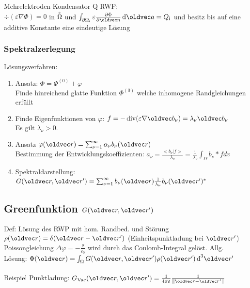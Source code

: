 \documentclass[6pt,a4paper]{scrartcl}
\let\vec\oldvec
\begin{document}
\begin{multicols}{4}
	Mehrelektroden-Kondensator Q-RWP:\\
	$\div(\varepsilon \nabla \Phi) = 0$ in $\overset{{}_\circ}{\Omega}$ und $\int_{\partial \Omega_l} \varepsilon \frac{\partial \Phi}{\partial \vec n} \diff \vec a = Q_l$ und  besitz bis auf eine additive Konstante eine eindeutige Lösung
	
	\subsubsection*{Spektralzerlegung}
	Lösungsverfahren:\\
	\begin{enumerate}
		\item Ansatz: $\Phi = \Phi^{(0)} + \varphi$\\
		Finde hinreichend glatte Funktion $\Phi^{(0)}$ welche inhomogene Randgleichungen erfüllt
		\item Finde Eigenfunktionen von $\varphi$: $f=-\div(\varepsilon \nabla \vec b_\nu) = \lambda_\nu \vec b_\nu$\\
			Es gilt $\lambda_\nu > 0$.
		\item Ansatz $\varphi(\vec r) = \sum_{\nu = 1}^\infty \alpha_\nu b_\nu(\vec r)$\\
		Bestimmung der Entwicklungskoeffizienten: $a_\nu = \frac{<b_\nu|f>}{\lambda_\nu} = \frac{1}{\lambda_\nu}\int_\Omega b_\nu * f dv$\\
		\item Spektraldarstellung: $G(\vec r, \vec r') = \sum_{\nu = 1}^\infty b_\nu (\vec r) \frac{1}{\lambda_\nu} b_\nu (\vec r')^*$\\
	\end{enumerate}
	
	
	
	\subsection{Greenfunktion $G(\vec r, \vec r')$}
	Def: Lösung des RWP mit hom. Randbed. und Störung $\rho(\vec r) = \delta(\vec r - \vec r')$ (Einheitspunktladung bei $\vec r'$)\\
	Poissongleichung $\Delta\varphi = -\frac{\rho}{\varepsilon_0}$ wird durch das Coulomb-Integral gelöst.
	Allg. Lösung: $\Phi(\vec r) = \int_\Omega G(\vec r, \vec r')\rho(\vec r') \diff^3 \vec r'$\\
	\\
	Beispiel Punktladung: $G_{\text{Vac}}(\vec r, \vec r') = \frac{1}{4 \pi \varepsilon} \frac{1}{\norm{\vec r - \vec r'}}$
	

\end{multicols}
\end{document}

